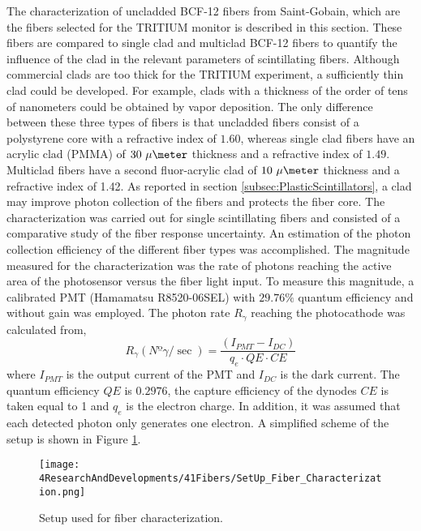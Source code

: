 The characterization of uncladded BCF-12 fibers from Saint-Gobain, which are the fibers selected for the TRITIUM monitor is described in this section. These fibers are compared to single clad and multiclad BCF-12 fibers to quantify the influence of the clad in the relevant parameters of scintillating fibers. Although commercial clads are too thick for the TRITIUM experiment, a sufficiently thin clad could be developed. For example, clads with a thickness of the order of tens of nanometers could be obtained by vapor deposition. The only difference between these three types of fibers is that uncladded fibers consist of a polystyrene core with a refractive index of $1.60$, whereas single clad fibers have an acrylic clad (PMMA) of $30~\mu\meter$ thickness and a refractive index of $1.49$. Multiclad fibers have a second fluor-acrylic clad of $10~\mu\meter$ thickness  and a refractive index of 1.42. As reported in section \ref{subsec:PlasticScintillators}, a clad may improve photon collection of the fibers and protects the fiber core. The characterization was carried out for single scintillating fibers and consisted of a comparative study of the fiber response uncertainty. An estimation of the photon collection efficiency of the different fiber types was accomplished. The magnitude measured for the characterization was the rate of photons reaching the active area of the photosensor versus the fiber light input. To measure this magnitude, a calibrated PMT (Hamamatsu R8520-06SEL) with $29.76\%$ quantum efficiency and without gain was employed. The photon rate $R_{\gamma}$ reaching the photocathode was calculated from,
\begin{equation}
R_{\gamma}(Nº\gamma/\sec) = \frac{\left( I_{PMT} - I_{DC} \right)}{q_e \cdot{} QE \cdot{} CE}
\label{eq:NumPhotonsFromIntensityPMT}
\end{equation}
where $I_{PMT}$ is the output current of the PMT and $I_{DC}$ is the dark current. The quantum efficiency $QE$ is $0.2976$, the capture efficiency of the dynodes $CE$ is taken equal to 1 and $q_e$ is the electron charge. In addition, it was assumed that each detected photon only generates one electron. A simplified scheme of the setup is shown in Figure \ref{fig:SetUpFiberCharacterization}.
\begin{figure}[h]
\centering
\texttt{[image: 4ResearchAndDevelopments/41Fibers/SetUp\_Fiber\_Characterization.png]}
\caption{Setup used for fiber characterization.\label{fig:SetUpFiberCharacterization}}
\end{figure}
